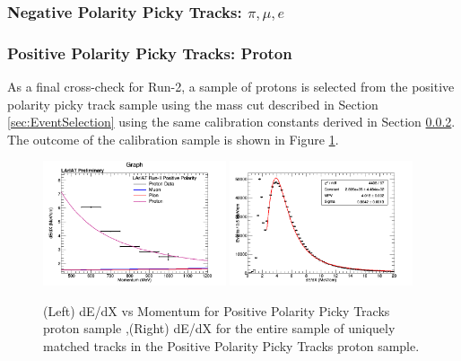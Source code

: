 \subsubsection{Negative Polarity Picky Tracks: $\pi, \mu, e$}\label{sec:Run2NegPickyTrkPiMuE}


\subsubsection{Positive Polarity Picky Tracks: Proton}\label{sec:Run2PosPickyTrkPiMuE}
\newpage

As a final cross-check for Run-2, a sample of protons is selected from the positive polarity picky track sample using the mass cut described in Section \ref{sec:EventSelection} using the same calibration constants derived in Section \ref{sec:Run2PosPickyTrkPiMuE}. The outcome of the calibration sample is shown in Figure \ref{fig:Run2PosPickyTrkProtonResults}.

\begin{figure}[htb]
\centering
\includegraphics[width=0.48\textwidth]{images/dEdXvsMomentumPosPolRun2ProtonFineBin.png}
\includegraphics[width=0.48\textwidth]{images/dEdXPosPolRun2Proton.png}
\caption{(Left) dE/dX vs Momentum for Positive Polarity Picky Tracks proton sample ,(Right) dE/dX for the entire sample of uniquely matched tracks in the Positive Polarity Picky Tracks proton sample.}
\label{fig:Run2PosPickyTrkProtonResults}
\end{figure}

